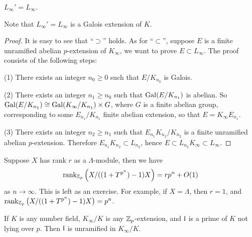 \begin{prop}
\label{Zp-ext-L-eq-L}
$L_\infty'=L_\infty$.
\end{prop}

Note that $L_\infty'=L_\infty$ is a Galois extension of $K$.

\begin{proof}
It is easy to see that ``$\supset$'' holds.
As for ``$\subset$'', suppose $E$ is a finite
unramified abelian $p$-extension of $K_\infty$,
we want to prove $E\subset L_\infty$. The proof consists of the following steps:

(1) There exists an integer $n_0\geq 0$ such that $E/K_{n_0}$ is Galois.

(2) There exists an integer $n_1\geq n_0$ such that ${\mathrm{Gal}}(E/K_{n_1})$ is abelian.
So ${\mathrm{Gal}}(E/K_{n_1})\cong{\mathrm{Gal}}(K_\infty/K_{n_1})\times G$,
where $G$ is a finite abelian group, corresponding to some $E_{n_1}/K_{n_1}$
finite abelian extension, so that $E=K_\infty E_{n_1}$.

(3) There exists an integer $n_2\geq n_1$ such that $E_{n_1}K_{n_2}/K_{n_2}$
is a finite unramified abelian $p$-extension. Therefore $E_{n_1}K_{n_2}\subset L_{n_2}$,
hence $E\subset L_{n_2}K_\infty\subset L_\infty$.
\end{proof}

\begin{lem}\label{p:rank-growth}
Suppose $X$ has rank $r$ as a $\Lambda$-module,
then we have
$$
\operatorname{rank}_{{\mathbb {Z}}_p}\left(X/((1+T^{p^n})-1)X\right)=rp^n+O(1)
$$
as $n\to\infty$. This is left as an exercise.
For example, if $X=\Lambda$, then $r=1$,
and $\operatorname{rank}_{{\mathbb {Z}}_p}\big(X/((1+T^{p^n})-1)X\big)=p^n$.
\end{lem}

\begin{prop}\label{p:unr-outside-p}
If $K$ is any number field, $K_\infty/K$ is any ${\mathbb {Z}}_p$-extension,
and ${\mathfrak{l}}$ is a prime of $K$ not lying over $p$. Then ${\mathfrak{l}}$ is unramified in $K_\infty/K$.
\end{prop}

